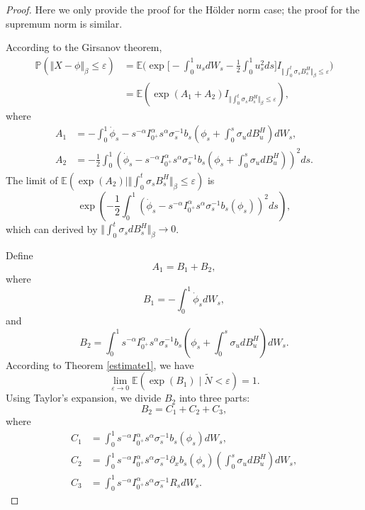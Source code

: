 \documentclass[preprint,12pt]{elsarticle}
\theoremstyle{definition}  %
\theoremstyle{plain}  %
\begin{document}
\begin{proof}
Here we only provide the proof for the H\"older norm case; the proof for the supremum norm is similar.

According to the Girsanov theorem,
	\begin{align*}
\mathbb{P}(\Vert X-\phi\Vert_\beta \leq \varepsilon)
&=\mathbb{E}\Big(\exp\Big[ -\int_0^1 u_s dW_s - \frac{1}{2} \int_0^1 u_s^2 ds\Big] I_{\Vert \int_0^t \sigma_s B^H_s\Vert_\beta \leq \varepsilon}\Big) \\
  &=	\mathbb{E}\left(\exp(A_1+A_2)I_{\Vert \int_0^t \sigma_s B^H_s\Vert_\beta \leq \varepsilon}\right),
\end{align*}
where
\begin{align*}
	A_1 &= -\int_0^1 \dot{\phi}_s- s^{-\alpha}I_{0^+}^\alpha s^{\alpha}  \sigma_s^{-1}b_s\left(\phi_s+\int_0^s \sigma_u dB^H_u\right)dW_s,\\
 	A_2 &= -\frac{1}{2}\int_0^1 \left(\dot{\phi}_s-s^{-\alpha}I_{0^+}^\alpha s^{\alpha} \sigma_s^{-1} b_s\left(\phi_s+\int_0^s \sigma_u dB^H_u\right)\right)^2 ds.
\end{align*}
	The limit of $\mathbb{E} (\exp(A_2)|\Vert \int_0^t \sigma_s B^H_s\Vert_\beta \leq \varepsilon)$ is
\begin{equation*}
	\exp\left(-\frac{1}{2}\int_0^1 \left(\dot{\phi}_s-s^{-\alpha}I_{0^+}^\alpha s^{\alpha}  \sigma_s^{-1} b_s\left(\phi_s\right)\right)^2 ds\right),
\end{equation*} 
which can derived by $\Vert\int_0^t \sigma_s dB^H_s \Vert_\beta\to 0$. 

	Define
	\begin{equation*}
		A_1=B_1+B_2, 
	\end{equation*}
	where
	\begin{equation*}
		B_1=-\int_0^1 \dot{\phi}_s dW_s,
	\end{equation*}
	and
	\begin{equation*}
		B_2=\int_0^1 s^{-\alpha}I_{0^+}^\alpha s^{\alpha}  \sigma_s^{-1} b_s\left(\phi_s+\int_0^s \sigma_u dB^H_u\right)dW_s.
	\end{equation*}
	According to Theorem \ref{estimate1}, we have
	\[
\lim _{\varepsilon \to 0}\mathbb{E}\left( \exp \left( B_1 \right) \mid \tilde{N} < \varepsilon \right) = 1.
\]
Using Taylor's expansion, we divide $B_2$ into three parts:
\begin{equation*}
	B_2=C_1+C_2+C_3,
\end{equation*}
where
\begin{align*}
	C_1 &= \int_0^1 s^{-\alpha}I_{0^+}^\alpha s^{\alpha}  \sigma_s^{-1} b_s\left(\phi_s\right)dW_s,\\
	C_2 &= \int_0^1 s^{-\alpha}I_{0^+}^\alpha s^{\alpha}  \sigma_s^{-1} \partial_xb_s\left(\phi_s\right)\left(\int_0^s \sigma_u dB^H_u\right)dW_s,\\
	C_3 &= \int_0^1 s^{-\alpha}I_{0^+}^\alpha s^{\alpha}  \sigma_s^{-1} R_sdW_s.
\end{align*}


\end{proof}
\end{document}
